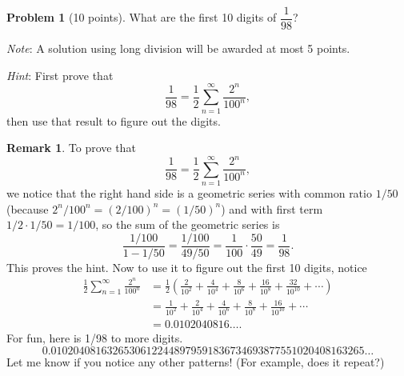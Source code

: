 \documentclass[11pt,oneside]{amsart}
\theoremstyle{definition}
\newtheorem{problem}{Problem}
\newtheorem*{remark}{Remark}
\begin{document}
\newpage




\begin{problem}[10 points]
What are the first 10 digits of $\dfrac 1{98}$?

\emph{Note}: A solution using long division will be awarded at most 5 points.

\emph{Hint}: First prove that
\[\frac 1{98}=\frac12 \sum_{n=1}^\infty \frac {2^n}{100^n},\]
then use that result to figure out the digits.
\end{problem}
\begin{remark}
  To prove that
  \[\frac 1{98}=\frac12 \sum_{n=1}^\infty \frac {2^n}{100^n},\]
  we notice that the right hand side is a geometric series with common ratio $1/50$ (because $2^n/100^n=(2/100)^n=(1/50)^n$) and with first term $1/2\cdot 1/50=1/100$, so the sum of the geometric series is
  \[\frac{1/100}{1-1/50}=\frac{1/100}{49/50}=\frac 1{100}\cdot \frac{50}{49}=\frac 1{98}.\]
  This proves the hint. Now to use it to figure out the first 10 digits, notice
  \[\begin{split}
    \frac12\sum_{n=1}^\infty\frac{2^n}{100^n} &=\frac12\left( \frac2{10^2}+\frac 4{10^4}+\frac8{10^6}+\frac{16}{10^8}+\frac{32}{10^{10}}+\cdots \right)\\
    &=\frac1{10^2}+\frac 2{10^4}+\frac4{10^6}+\frac{8}{10^8}+\frac{16}{10^{10}}+\cdots \\
    &= 0.0102040816\ldots.
  \end{split}\]
  For fun, here is 1/98 to more digits.
  \[0.01020408163265306122448979591836734693877551020408163265\ldots\]
  Let me know if you notice any other patterns! (For example, does it repeat?)
\end{remark}
\end{document}
